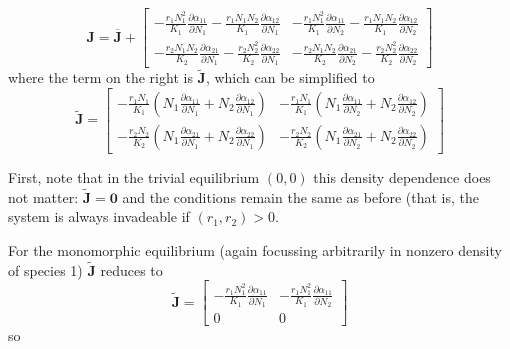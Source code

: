 \documentclass[12pt,a4paper]{article}
\begin{document}
\begin{equation}
  \label{eq:competitive-lv-jac2}
  \mathbf{J} = \overline{\mathbf{J}} +
  \begin{bmatrix}
    -\frac{r_1 N_1^2}{K_1}  \frac{\partial \alpha_{11}}{\partial N_1}
    -\frac{r_1 N_1N_2}{K_1} \frac{\partial \alpha_{12}}{\partial N_1}
    &
    -\frac{r_1 N_1^2}{K_1}  \frac{\partial \alpha_{11}}{\partial N_2}
    -\frac{r_1 N_1N_2}{K_1} \frac{\partial \alpha_{12}}{\partial N_2}
    \\
    -\frac{r_2 N_1N_2}{K_2}  \frac{\partial \alpha_{21}}{\partial N_1}
    -\frac{r_2 N_2^2}{K_2} \frac{\partial \alpha_{22}}{\partial N_1}
    &
    -\frac{r_2 N_1N_2}{K_2}  \frac{\partial \alpha_{21}}{\partial N_2}
    -\frac{r_2 N_2^2}{K_2} \frac{\partial \alpha_{22}}{\partial N_2}
  \end{bmatrix}
\end{equation}
where the term on the right is $\widetilde{\mathbf{J}}$, which can be
simplified to
\begin{equation*}
  \widetilde{\mathbf{J}} =
  \begin{bmatrix}
    -\frac{r_1 N_1}{K_1}\left(
      N_1 \frac{\partial \alpha_{11}}{\partial N_1} +
      N_2 \frac{\partial \alpha_{12}}{\partial N_1}\right)
    &
    -\frac{r_1 N_1}{K_1}\left(
      N_1\frac{\partial \alpha_{11}}{\partial N_2} +
      N_2\frac{\partial \alpha_{12}}{\partial N_2}\right)
    \\
    -\frac{r_2 N_2}{K_2}\left(
      N_1\frac{\partial \alpha_{21}}{\partial N_1} +
      N_2\frac{\partial \alpha_{22}}{\partial N_1}\right)
    &
    -\frac{r_2 N_2}{K_2}\left(
      N_1\frac{\partial \alpha_{21}}{\partial N_2} +
      N_2\frac{\partial \alpha_{22}}{\partial N_2}\right)
  \end{bmatrix}
\end{equation*}

First, note that in the trivial equilibrium $(0, 0)$ this density
dependence does not matter: $\widetilde{\mathbf{J}} = \mathbf{0}$ and
the conditions remain the same as before (that is, the system is
always invadeable if $(r_1, r_2) > 0$.

For the monomorphic equilibrium (again focussing arbitrarily in
nonzero density of species 1) $\widetilde{\mathbf{J}}$ reduces to
\begin{equation*}
  \widetilde{\mathbf{J}} =
  \begin{bmatrix}
    -\frac{r_1 N_1^2}{K_1} \frac{\partial \alpha_{11}}{\partial N_1}
    &
    -\frac{r_1 N_1^2}{K_1} \frac{\partial \alpha_{11}}{\partial N_2}
    \\0&0
  \end{bmatrix}
\end{equation*}
so
\end{document}
